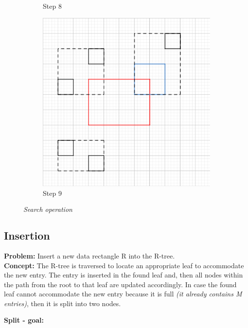 \documentclass{article}
\begin{document}
\begin{figure}[h]
\begin{subfigure}{0.3\textwidth}
    \caption{Step 8}
    \centering
    \end{subfigure}
    \begin{subfigure}{0.3\textwidth}
    \includegraphics[width=\textwidth]{search/9.png}
    \caption{Step 9}
    \centering
    \end{subfigure}
\caption{\textit{Search operation}}

\end{figure} 
\clearpage

\subsection{Insertion}

\textbf{Problem:} Insert a new data rectangle R into the R-tree.\\
\textbf{Concept:} The R-tree is traversed to locate an appropriate leaf to accommodate the new entry. The entry is inserted in the found leaf and, then all nodes within the path from the root to that leaf are updated accordingly. In case the found leaf cannot accommodate the new entry because it is full \textit{(it already contains M entries)}, then it is split into two nodes.



\textbf{Split - goal:} 
\end{document}
